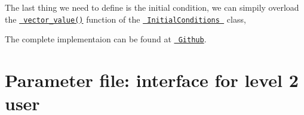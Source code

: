 The last thing we need to define is the initial condition, we can simpily overload the \href{../html/class_initial_conditions.html\#aa10cfdd7350c3810a8deab707f397657}{\texttt{ vector\+\_\+value()}} function of the \href{../html/class_initial_conditions.html}{\texttt{ Initial\+Conditions }} class, 
\begin{DoxyCode}{0}
\DoxyCodeLine{\}}
\end{DoxyCode}


The complete implementaion can be found at \href{https://github.com/mechanoChem/mechanoChemFEM/tree/example/Example4_growth}{\texttt{ Github}}. \hypertarget{growth_file}{}\section{Parameter file\+: interface for level 2 user}\label{growth_file}

